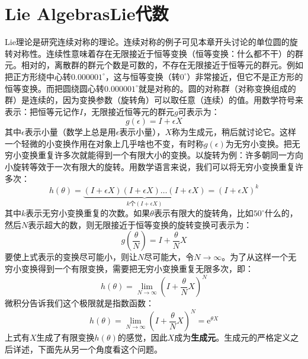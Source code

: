 \section[Lie代数]{Lie Algebras\quad Lie代数}
\label{sec3.4}
Lie理论是研究连续对称的理论。连续对称的例子可见本章开头讨论的单位圆的旋转对称性。连续性意味着存在无限接近于恒等变换（恒等变换：什么都不干）的群元。相对的，离散群的群元个数是可数的，不存在无限接近于恒等元的群元。例如把正方形绕中心转$0.000001^\circ$，这与恒等变换（转$0^\circ$）非常接近，但它不是正方形的恒等变换。而把圆绕圆心转$0.000001^\circ$就是对称的。圆的对称群（对称变换组成的群）是连续的，因为变换参数（旋转角）可以取任意（连续）的值。用数学符号来表示：把恒等元记作$I$，无限接近恒等元的群元$g$可表示为：
\begin{equation}
\label{equ3.48}
g(\epsilon) = I + \epsilon X
\end{equation}
其中$\epsilon$表示小量（数学上总是用$\epsilon$表示小量），$X$称为生成元，稍后就讨论它。这样一个轻微的小变换作用在对象上几乎啥也不变，有时称$g(\epsilon)$为无穷小变换。把无穷小变换重复许多次就能得到一个有限大小的变换。以旋转为例：许多朝同一方向小旋转等效于一次有限大的旋转。用数学语言来说，我们可以将无穷小变换重复许多次：
\begin{equation}
\label{equ3.49}
h(\theta) = \underbrace{(I + \epsilon X)(I + \epsilon X) \dots (I + \epsilon X)}_{k\text{个}(I + \epsilon X)} = (I + \epsilon X)^k
\end{equation}
其中$k$表示无穷小变换重复的次数。如果$\theta$表示有限大的旋转角，比如$50^\circ$什么的，然后$N$表示超大的数，则无限接近于恒等变换的旋转变换可表示为：
\begin{equation}
\label{equ3.50}
g(\frac{\theta}{N}) = I + \frac{\theta}{N} X
\end{equation}
要使上式表示的变换尽可能小，则让$N$尽可能大，令$N \rightarrow \infty$。为了从这样一个无穷小变换得到一个有限变换，需要把无穷小变换重复无限多次，即：
\begin{equation}
\label{equ3.51}
h(\theta) = \lim_{N \rightarrow \infty} \left( I + \frac{\theta}{N}X \right)^N
\end{equation}
微积分告诉我们这个极限就是指数函数：
\begin{equation}
\label{equ3.52}
h(\theta) = \lim_{N \rightarrow \infty} \left( I + \frac{\theta}{N}X \right)^N = \mathrm{e}^{\theta X}
\end{equation}
上式有$X$生成了有限变换$h(\theta)$的感觉，因此$X$成为{\bf 生成元}。生成元的严格定义之后详述，下面先从另一个角度看这个问题。

